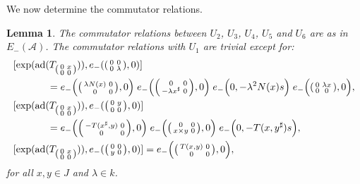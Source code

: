 \documentclass[oneside,a4paper]{amsart} %
\newtheorem{lemma}[theorem]{Lemma}
\theoremstyle{definition}
\DeclareMathOperator{\ad}{ad}
\newcommand{\A}{\mathcal{A}}
\numberwithin{equation}{section}
\begin{document}
We now determine the commutator relations.
\begin{lemma}
\label{commutator rel}
	The commutator relations between $U_2$, $U_3$, $U_4$, $U_5$ and $U_6$ are as in $E_-(\A)$.
	The commutator relations with $U_1$ are trivial except for:
	\begin{align*}
		&[\exp(\ad(T_{\begin{psmallmatrix} 0&x\\0&0 \end{psmallmatrix}})), e_-(\begin{psmallmatrix} 0&0\\0&\lambda \end{psmallmatrix},0)] \\
		      &\hspace*{8ex} = e_-\Bigl(\begin{psmallmatrix} \lambda N(x)&0\\0 &0 \end{psmallmatrix},0\Bigr) \; e_-\Bigl(\begin{psmallmatrix} 0&0\\-\lambda x^\sharp &0 \end{psmallmatrix},0 \Bigr) \; e_- \Bigl(0,-\lambda^2N(x)s\Bigr) \; e_-\Bigl(\begin{psmallmatrix} 0&\lambda x\\0 &0 \end{psmallmatrix},0\Bigr), \\
		&[\exp(\ad(T_{\begin{psmallmatrix} 0&x\\0&0 \end{psmallmatrix}})),e_-(\begin{psmallmatrix} 0&y\\0&0 \end{psmallmatrix},0)] \\
		      &\hspace*{8ex} = e_- \Bigl(\begin{psmallmatrix} -T(x^\sharp,y)&0\\0&0 \end{psmallmatrix},0\Bigr) \; e_-\Bigl(\begin{psmallmatrix} 0&0\\x\times y&0 \end{psmallmatrix},0\Bigr) \; e_-\Bigl(0,-T(x,y^\sharp)s\Bigr),\\
		&[\exp(\ad(T_{\begin{psmallmatrix} 0&x\\0&0 \end{psmallmatrix}})),e_-(\begin{psmallmatrix} 0&0\\y&0 \end{psmallmatrix},0)] = e_- \Bigl(\begin{psmallmatrix} T(x,y)&0\\0&0 \end{psmallmatrix},0\Bigr),
	\end{align*}
	for all $x,y\in J$ and $\lambda \in k$.
\end{lemma}
\end{document}
